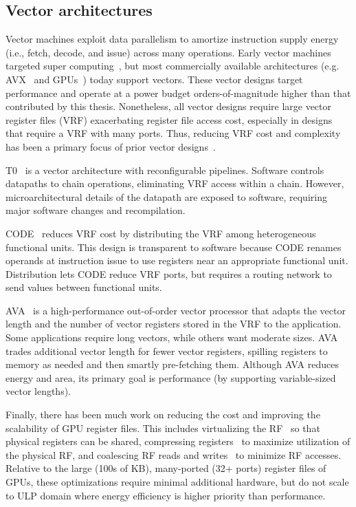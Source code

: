 \subsection{Vector architectures}
\label{chapter:background:program:vector}
Vector machines exploit data parallelism to amortize instruction supply energy (i.e., fetch, decode, and issue) across many operations.
% 
Early vector machines targeted super computing~\cite{cray_patent}, but most commercially available architectures (e.g. AVX~\cite{avx} and GPUs~\cite{fermi}) today support vectors.
% 
These vector designs target performance and operate at a power budget
orders-of-magnitude higher than that contributed by this thesis.
% 
Nonetheless, all vector designs require large vector register files (VRF)
exacerbating register file access cost, especially in designs that require a
VRF with many ports. 
% 
Thus, reducing VRF cost and complexity has been a primary focus of prior vector
designs~\cite{asanovic1996t0,kozyrakis2003overcoming}.

T0~\cite{asanovic1996t0,wawrzynek1996spert} is a vector architecture with
reconfigurable pipelines. 
% 
Software controls datapaths to chain operations,
eliminating VRF access within a chain.  
% 
However, microarchitectural details of
the datapath are exposed to software, requiring major software changes and
recompilation.

CODE~\cite{kozyrakis2003overcoming} reduces VRF cost by distributing the VRF
among heterogeneous functional units.
% 
This design is transparent to software 
because CODE renames operands at instruction issue
to use registers near an appropriate functional unit.
% 
Distribution lets CODE reduce VRF ports, but requires a routing network
to send values between functional units.

AVA~\cite{lazo2021adaptable} is a high-performance out-of-order vector processor that adapts the vector length and the number of vector registers stored in the VRF to the application.
% 
Some applications require long vectors, while others want moderate sizes.
% 
AVA trades additional vector length for fewer vector registers, spilling registers to memory as needed and then smartly pre-fetching them.
% 
Although AVA reduces energy and area, its primary goal is performance (by supporting variable-sized vector lengths).

Finally, there has been much work on reducing the cost and improving the scalability of GPU register files.
% 
This includes virtualizing the RF~\cite{jeon2015gpu,vijaykumar2016zorua} so that physical registers can be shared, compressing registers~\cite{lee2015warped} to maximize utilization of the physical RF, and coalescing RF reads and writes~\cite{asghari2019corf} to minimize RF accesses. 
% 
Relative to the large (100s of KB), many-ported (32+ ports) register files of GPUs, these optimizations require minimal additional hardware, but do not scale to ULP domain where energy efficiency is higher priority than performance.

